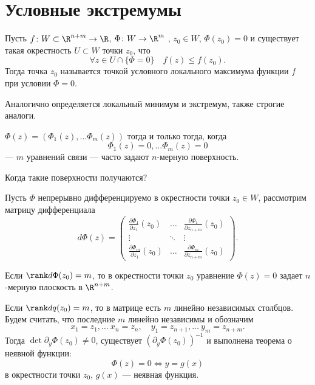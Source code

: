 % 
% 
%
\section{Условные экстремумы}
\begin{defn}
    Пусть $ f\colon W \subset \R^{n+m} \to  \R$, $ \Phi\colon W \to  \R^{m} $ , $ z_0 \in W$, $ \Phi(z_0) = 0$ и существует такая окрестность $ U \subset W$ точки $ z_0$, что
    \[
	\forall z \in U \cap \{\Phi = 0\} \quad f(z) \le f(z_0)
    .\] 
    Тогда точка $ z_0$ называется {\sf точкой условного локального максимума} функции $ f$ при условии $ \Phi = 0$.  
\end{defn}
\begin{note}
    Аналогично определяется локальный минимум и экстремум, также строгие аналоги.
\end{note}
\begin{note}
    $ \Phi(z) = \left(\Phi_1(z), \ldots \Phi_m(z)\right)  $ тогда и только тогда, когда 
    \[
	\Phi_1(z) = 0, \ldots \Phi_m(z) = 0
    \] 
    --- $ m$ уравнений связи --- часто задают  $ n$-мерную поверхность.
\end{note}
Когда такие поверхности получаются?

Пусть $ \Phi$ непрерывно дифференцируемо в окрестности точки  $ z_0 \in W$, рассмотрим матрицу дифференциала
\[
    d\Phi (z) = 
    \begin{pmatrix}
	\frac{\partial \Phi_1}{\partial z_1}(z_0) & \ldots & \frac{\partial \Phi_1}{\partial z_{n+m}}(z_0) \\
	\vdots & \ddots & \vdots \\
	\frac{\partial \Phi_m}{\partial z_1}(z_0) & \ldots & \frac{\partial \Phi_m}{\partial z_{n+m}}(z_0)
    \end{pmatrix}
.\] 

Если $ \rank d\Phi(z_0) = m$, то в окрестности точки $ z_0$ уравнение $ \Phi(z) = 0$ задает  $ n$-мерную плоскость в  $ \R^{n+m}$.

	Если $ \rank dq(z_0) = m$, то в матрице есть $ m$ линейно  независимых столбцов. Будем считать, что последние  $ m$ линейно независимы и обозначим
	 \[
	x_1=z_1 , \ldots ~x_{n} = z_n, \quad y_1 = z_{n+1}, \ldots ~ y_m = z_{n+m}
	.\] 
	Тогда $ \det \partial _y \Phi(z_0) \ne 0 $, существует $ \left( \partial _y \Phi(z_0) \right)^{-1}$ и выполнена теорема о неявной функции:
	\[
		\Phi(z) = 0 \Longleftrightarrow  y = g(x)
	\] 
	в окрестности точки $ z_0$, $ g(x)$ --- неявная функция.

